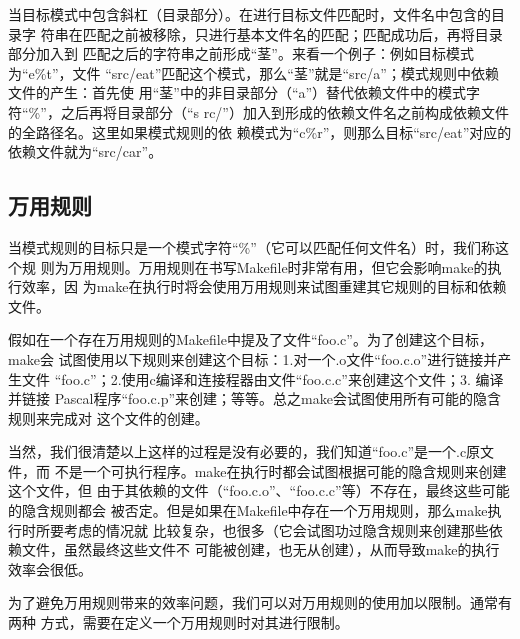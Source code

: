 当目标模式中包含斜杠（目录部分）。在进行目标文件匹配时，文件名中包含的目录字
符串在匹配之前被移除，只进行基本文件名的匹配；匹配成功后，再将目录部分加入到
匹配之后的字符串之前形成“茎”。来看一个例子：例如目标模式为“e\%t”，文件
“src/eat”匹配这个模式，那么“茎”就是“src/a”；模式规则中依赖文件的产生：首先使
用“茎”中的非目录部分（“a”）替代依赖文件中的模式字符“\%”，之后再将目录部分（“s
rc/”）加入到形成的依赖文件名之前构成依赖文件的全路径名。这里如果模式规则的依
赖模式为“c\%r”，则那么目标“src/eat”对应的依赖文件就为“src/car”。

\subsection{万用规则}
当模式规则的目标只是一个模式字符“\%”（它可以匹配任何文件名）时，我们称这个规
则为万用规则。万用规则在书写Makefile时非常有用，但它会影响make的执行效率，因
为make在执行时将会使用万用规则来试图重建其它规则的目标和依赖文件。

假如在一个存在万用规则的Makefile中提及了文件“foo.c”。为了创建这个目标，make会
试图使用以下规则来创建这个目标：1.对一个.o文件“foo.c.o”进行链接并产生文件
“foo.c”；2.使用c编译和连接程器由文件“foo.c.c”来创建这个文件；3. 编译并链接
Pascal程序“foo.c.p”来创建；等等。总之make会试图使用所有可能的隐含规则来完成对
这个文件的创建。

当然，我们很清楚以上这样的过程是没有必要的，我们知道“foo.c”是一个.c原文件，而
不是一个可执行程序。make在执行时都会试图根据可能的隐含规则来创建这个文件，但
由于其依赖的文件（“foo.c.o”、“foo.c.c”等）不存在，最终这些可能的隐含规则都会
被否定。但是如果在Makefile中存在一个万用规则，那么make执行时所要考虑的情况就
比较复杂，也很多（它会试图功过隐含规则来创建那些依赖文件，虽然最终这些文件不
可能被创建，也无从创建），从而导致make的执行效率会很低。

为了避免万用规则带来的效率问题，我们可以对万用规则的使用加以限制。通常有两种
方式，需要在定义一个万用规则时对其进行限制。

